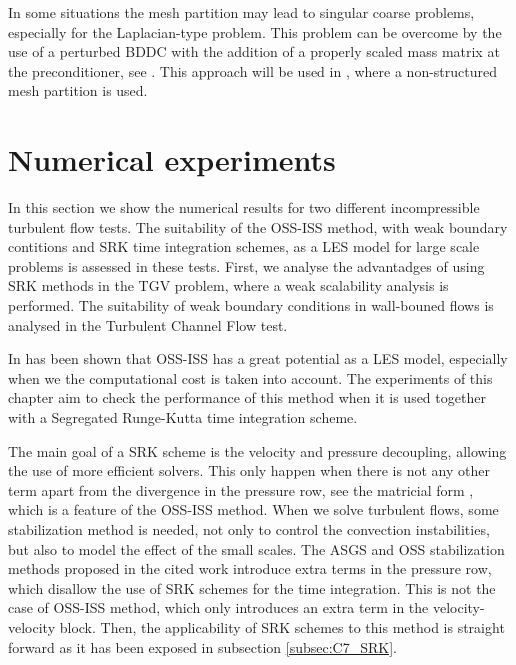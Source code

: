 In some situations the mesh partition may lead to singular coarse problems, especially for the Laplacian-type problem. This problem can be overcome by the use of a perturbed BDDC with the addition of a properly scaled mass matrix at the preconditioner, see \cite{santiago_badia_hieu_nguyen_balancing_2015}. This approach will be used in , where a non-structured mesh partition is used.


\section{Numerical experiments}
\label{sec-C7_experiments}
In this section we show the numerical results for two different incompressible turbulent flow tests. The suitability of the OSS-ISS method, with weak boundary contitions and SRK time integration schemes, as a LES model for large scale problems is assessed in these tests. First, we analyse the advantadges of using SRK methods in the TGV problem, where a weak scalability analysis is performed. The suitability of weak boundary conditions in wall-bouned flows is analysed in the Turbulent Channel Flow test. %

In \cite{colomes_mixed_2015} has been shown that OSS-ISS has a great potential as a LES model, especially when we the computational cost is taken into account. The experiments of this chapter aim to check the performance of this method when it is used together with a Segregated Runge-Kutta time integration scheme.

The main goal of a SRK scheme is the velocity and pressure decoupling, allowing the use of more efficient solvers. This only happen when there is not any other term apart from the divergence in the pressure row, see the matricial form , which is a feature of the OSS-ISS method. When we solve turbulent flows, some stabilization method is needed, not only to control the convection instabilities, but also to model the effect of the small scales. The ASGS and OSS stabilization methods proposed in the cited work introduce extra terms in the pressure row, which disallow the use of SRK schemes for the time integration. This is not the case of OSS-ISS method, which only introduces an extra term in the velocity-velocity block. Then, the applicability of SRK schemes to this method is straight forward as it has been exposed in subsection \ref{subsec:C7_SRK}.

